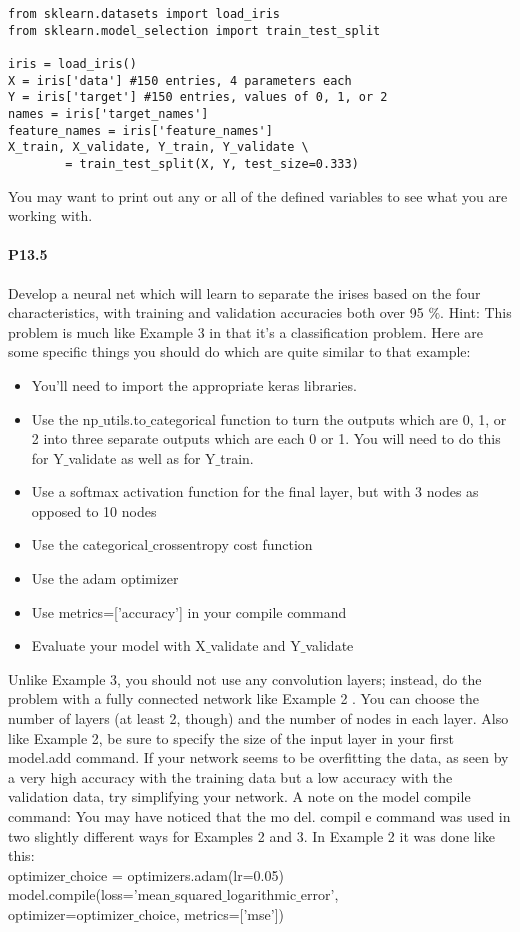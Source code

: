 \begin{lstlisting}
from sklearn.datasets import load_iris
from sklearn.model_selection import train_test_split

iris = load_iris()
X = iris['data'] #150 entries, 4 parameters each
Y = iris['target'] #150 entries, values of 0, 1, or 2
names = iris['target_names']
feature_names = iris['feature_names']
X_train, X_validate, Y_train, Y_validate \
		= train_test_split(X, Y, test_size=0.333)

\end{lstlisting}

You may want to print out any or all of the defined variables to see what you are
working with.

\paragraph*{P13.5} Develop a neural net which will learn to separate the irises based on the
four characteristics, with training and validation accuracies both over 95 $\%$.
Hint: This problem is much like Example 3 in that it's a classification problem. Here are some specific things you should do which are quite similar to that example:
\begin{itemize}
\item You\rq ll need to import the appropriate keras libraries.
\item Use the np$\_$utils.to$\_$categorical function to turn the outputs which
are 0, 1, or 2 into three separate outputs which are each 0 or 1. You will need
to do this for Y$\_$validate as well as for Y$\_$train.
\item Use a softmax activation function for the final layer, but with 3 nodes as
opposed to 10 nodes
\item Use the categorical$\_$crossentropy cost function
\item Use the adam optimizer
\item Use metrics=['accuracy'] in your compile command
\item  Evaluate your model with X$\_$validate and Y$\_$validate
\end{itemize}
Unlike Example 3, you should not use any convolution layers; instead, do the problem with a fully connected network like Example 2 . You can choose the number of layers (at least 2, though) and the number of nodes in each layer. Also like Example 2, be sure to specify the size of the input layer in your first model.add command. If your network seems to be overfitting the data, as seen by a very high accuracy with the training data but a low accuracy with the validation data, try simplifying your network.
A note on the model compile command: You may have noticed that the mo del. compil e command was used in two slightly different ways for Examples 2 and 3. In Example 2 it was done like this:\\
optimizer$\_$choice = optimizers.adam(lr=0.05)\\
model.compile(loss='mean$\_$squared$\_$logarithmic$\_$error',\\
optimizer=optimizer$\_$choice, metrics=['mse'])\\

